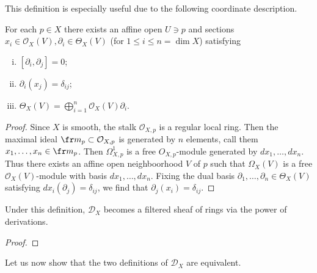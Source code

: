 This definition is especially useful due to the following coordinate description.

\begin{lemma}
    For each $p\in X$ there exists an affine open $U\ni p$ and sections
    $x_i\in\mathcal{O}_X(V),\partial_i\in\Theta_X(V)$ (for $1\leq i\leq n=\dim X$) satisfying
    \begin{enumerate}[(i)]
        \item $[\partial_i,\partial_j]=0$;
        \item $\partial_i(x_j)=\delta_{ij}$;
        \item $\Theta_X(V)=\bigoplus_{i=1}^n\mathcal{O}_X(V)\partial_i$.
    \end{enumerate}
\end{lemma}
\begin{proof}
    Since $X$ is smooth, the stalk $\mathcal{O}_{X,p}$ is a regular local ring. Then the maximal
    ideal $\fr m_p\subset \mathcal{O}_{X,p}$ is generated by $n$ elements, call them
    $x_1,\ldots,x_n\in\fr m_p$. Then $\Omega^1_{X,p}$ is a free $O_{X,p}$-module generated
    by $dx_1,\ldots, dx_n$. Thus there exists an affine open neighboorhood
    $V$ of $p$ such that $\Omega_X(V)$ is a free $\mathcal{O}_X(V)$-module with basis
    $dx_1,\ldots,dx_n$. Fixing the dual basis $\partial_1,\ldots,\partial_n\in\Theta_X(V)$
    satisfying $dx_i(\partial_j)=\delta_{ij}$, we find that $\partial_j(x_i)=\delta_{ij}$.
\end{proof}

\begin{lemma}
    Under this definition, $\mathscr{D}_X$ becomes a filtered sheaf of rings
    via the power of derivations.
    \label{lem:filter2}
\end{lemma}
\begin{proof}
\end{proof}

Let us now show that the two definitions of $\mathscr{D}_X$ are equivalent.

